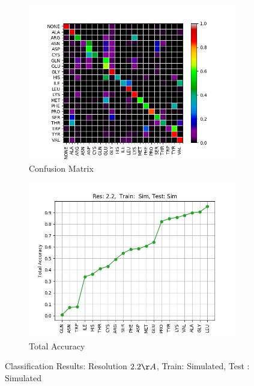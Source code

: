 \begin{figure}[!ht]
\begin{minipage}[b]{0.45\linewidth}
\begin{subfigure}[b]{\linewidth}
	\includegraphics[width=1.27\textwidth]{pics/CM_22_SS}
	\caption{Confusion Matrix}
	\label{f:CM_22_SS}
\end{subfigure}
\end{minipage}
\begin{minipage}[b]{0.45\linewidth}
\begin{subfigure}[b]{\linewidth}
	\includegraphics[width=1.27\textwidth]{pics/ss22_acc.png}
	\caption{Total Accuracy}
	\label{f:ss22_acc}
\end{subfigure}
\end{minipage}
\caption{Classification Results: Resolution $2.2 \AA$,  Train: Simulated, Test : Simulated}
\end{figure}


